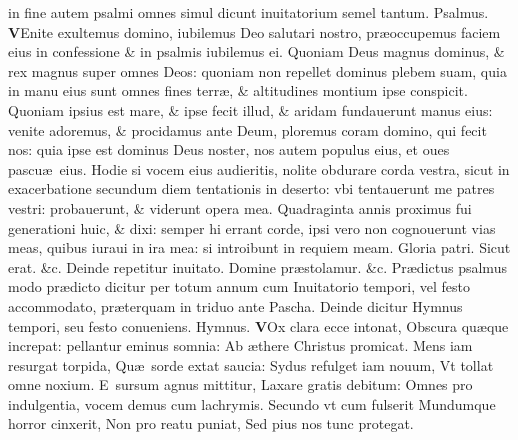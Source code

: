 \documentclass[a5paper,10pt]{book}
\def\ae{æ}
\begin{document}
\begin{multicols*}{2}
in fine autem psalmi omnes simul dicunt inuitatorium semel tantum. Psalmus. \color{black}
\vspace{-.25em}
\lettrine[lines=2]{\bfseries \color{red} V}{}Enite exultemus domino, iubilemus Deo salutari nostro, pr\ae occupemus faciem eius in confessione \& in psalmis iubilemus ei.
\newline \color{red} Q\color{black}uoniam Deus magnus dominus, \& rex magnus super omnes Deos: quoniam non repellet dominus plebem suam, quia in manu eius sunt omnes fines terr\ae , \& altitudines montium ipse conspicit.
\newline \color{red} Q\color{black}uoniam ipsius est mare, \& ipse fecit illud, \& aridam fundauerunt manus eius: venite adoremus, \& procidamus ante Deum, ploremus coram domino, qui fecit nos: quia ipse est dominus Deus noster, nos autem populus eius, et oues pascu\ae \ eius.
\newline \color{red} H\color{black}odie si vocem eius audieritis, nolite obdurare corda vestra, sicut in exacerbatione secundum diem tentationis in deserto: vbi tentauerunt me patres vestri: probauerunt, \& viderunt opera mea.
\newline \color{red} Q\color{black}uadraginta annis proximus fui generationi huic, \& dixi: semper hi errant corde, ipsi vero non cognouerunt vias meas, quibus iuraui in ira mea: si introibunt in requiem meam.
\newline \color{red} G\color{black}loria patri. \color{red} S\color{black}icut erat. \&c.
\newline {} \color{red} Deinde repetitur inuitato. \color{black} Domine pr\ae stolamur. \color{red} \&c. \color{black}
\newline \color{red} Pr\ae dictus psalmus modo pr\ae dicto dicitur per totum annum cum Inuitatorio tempori, vel festo accommodato, pr\ae terquam in triduo ante Pascha. Deinde dicitur Hymnus tempori, seu festo conueniens. Hymnus. \color{black}
\vspace{-.25em}
\lettrine[lines=2]{\bfseries \color{red} V}{}Ox clara ecce intonat, Obscura qu\ae que increpat: pellantur eminus somnia: Ab \ae there Christus promicat.
\newline \color{red} M\color{black}ens iam resurgat torpida, Qu\ae \ sorde extat saucia: Sydus refulget iam nouum, Vt tollat omne noxium.
\newline \color{red} E\color{black}\ sursum agnus mittitur, Laxare gratis debitum: Omnes pro indulgentia, vocem demus cum lachrymis.
\newline \color{red} S\color{black}ecundo vt cum fulserit Mundumque horror cinxerit, Non pro reatu puniat, Sed pius nos tunc protegat.

\end{multicols*}
\end{document}
